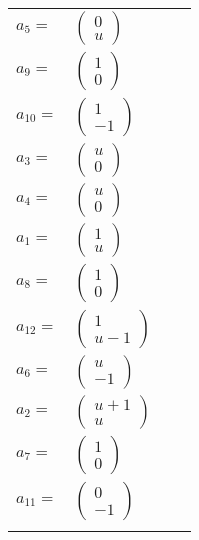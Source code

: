 \documentclass[1p]{elsarticle_modified}
\theoremstyle{definition}
\begin{document}
\begin{tabular}{m{7pt} m{180pt} m{7pt} m{180pt} }
\flushright $a_{5}=$&$\begin{pmatrix}0\\u\end{pmatrix}$ \\
\flushright $a_{9}=$&$\begin{pmatrix}1\\0\end{pmatrix}$ \\
\flushright $a_{10}=$&$\begin{pmatrix}1\\-1\end{pmatrix}$ \\
\flushright $a_{3}=$&$\begin{pmatrix}u\\0\end{pmatrix}$ \\
\flushright $a_{4}=$&$\begin{pmatrix}u\\0\end{pmatrix}$ \\
\flushright $a_{1}=$&$\begin{pmatrix}1\\u\end{pmatrix}$ \\
\flushright $a_{8}=$&$\begin{pmatrix}1\\0\end{pmatrix}$ \\
\flushright $a_{12}=$&$\begin{pmatrix}1\\u-1\end{pmatrix}$ \\
\flushright $a_{6}=$&$\begin{pmatrix}u\\-1\end{pmatrix}$ \\
\flushright $a_{2}=$&$\begin{pmatrix}u+1\\u\end{pmatrix}$ \\
\flushright $a_{7}=$&$\begin{pmatrix}1\\0\end{pmatrix}$ \\
\flushright $a_{11}=$&$\begin{pmatrix}0\\-1\end{pmatrix}$\\&\end{tabular}
\end{document}
